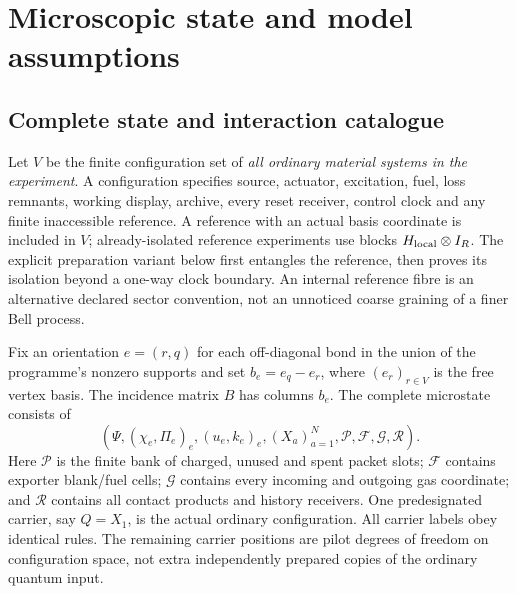 \documentclass[11pt]{article}
\theoremstyle{definition}\newtheorem{definition}[theorem]{Definition}
\theoremstyle{remark}\newtheorem{remark}[theorem]{Remark}
\begin{document}
\section{Microscopic state and model assumptions}\label{sec:model}
\subsection{Complete state and interaction catalogue}
Let $V$ be the finite configuration set of \emph{all ordinary material systems in the experiment}. A configuration specifies source, actuator, excitation, fuel, loss remnants, working display, archive, every reset receiver, control clock and any finite inaccessible reference. A reference with an actual basis coordinate is included in $V$; already-isolated reference experiments use blocks $H_{\rm local}\otimes I_R$. The explicit preparation variant below first entangles the reference, then proves its isolation beyond a one-way clock boundary. An internal reference fibre is an alternative declared sector convention, not an unnoticed coarse graining of a finer Bell process.

Fix an orientation $e=(r,q)$ for each off-diagonal bond in the union of the programme's nonzero supports and set $b_e=e_q-e_r$, where $(e_r)_{r\in V}$ is the free vertex basis. The incidence matrix $B$ has columns $b_e$. The complete microstate consists of
\begin{equation}
 \left(\Psi,(\chi_e,\Pi_e)_e,(u_e,k_e)_e,
       (X_a)_{a=1}^N,\mathcal P,\mathcal F,\mathcal G,\mathcal R\right).
 \label{eq:microstate}
\end{equation}
Here $\mathcal P$ is the finite bank of charged, unused and spent packet slots; $\mathcal F$ contains exporter blank/fuel cells; $\mathcal G$ contains every incoming and outgoing gas coordinate; and $\mathcal R$ contains all contact products and history receivers. One predesignated carrier, say $Q=X_1$, is the actual ordinary configuration. All carrier labels obey identical rules. The remaining carrier positions are pilot degrees of freedom on configuration space, not extra independently prepared copies of the ordinary quantum input.
\end{document}
